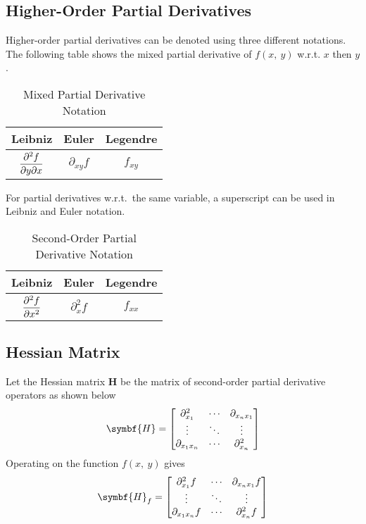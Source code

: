 \documentclass{article}
\begin{document}
\subsection{Higher-Order Partial Derivatives}
\begin{definition}
    Higher-order partial derivatives can be denoted using three different
    notations. The following table shows the mixed partial derivative of
    \(f(x,\: y)\) w.r.t. \(x\) then \(y\).
    \begin{table}[H]
        \centering
        \begin{tabular}{c c c}
            \toprule
            \textbf{Leibniz}               & \textbf{Euler}        & \textbf{Legendre} \\
            \midrule
            \(\displaystyle\pdv{f}{y}{x}\) & \(\partial_{x y}{f}\) & \(f_{x y}\)       \\
            \bottomrule
        \end{tabular}
        \caption{Mixed Partial Derivative Notation}
    \end{table}
    For partial derivatives w.r.t.\ the same variable, a superscript can be used
    in Leibniz and Euler notation.
    \begin{table}[H]
        \centering
        \begin{tabular}{c c c}
            \toprule
            \textbf{Leibniz}               & \textbf{Euler}        & \textbf{Legendre} \\
            \midrule
            \(\displaystyle\pdv[2]{f}{x}\) & \(\partial^2_{x}{f}\) & \(f_{x x}\)       \\
            \bottomrule
        \end{tabular}
        \caption{Second-Order Partial Derivative Notation}
    \end{table}
\end{definition}
\subsection{Hessian Matrix}
\begin{definition}
    Let the Hessian matrix \(\symbf{H}\) be the matrix of second-order partial
    derivative operators as shown below
    \begin{equation*}
        \symbf{H} =
        \mqty[
        \partial^2_{x_1} & \cdots & \partial_{x_n x_1} \\
        \vdots & \ddots & \vdots \\
        \partial_{x_1x_n} & \cdots & \partial^2_{x_n}
        ]
    \end{equation*}
    Operating on the function \(f(x,\: y)\) gives
    \begin{equation*}
        \symbf{H}_f =
        \mqty[
        \partial^2_{x_1}f & \cdots & \partial_{x_n x_1}f \\
        \vdots & \ddots & \vdots \\
        \partial_{x_1x_n}f & \cdots & \partial^2_{x_n}f
        ]
    \end{equation*}
\end{definition}
\end{document}
